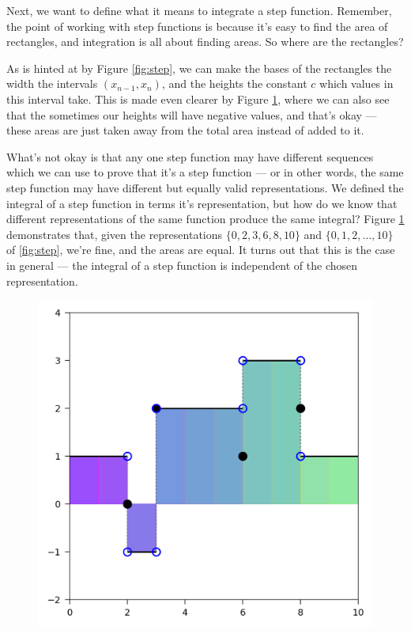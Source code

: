 \medskip
Next, we want to define what it means to integrate a step function. Remember, the point of working with step functions is because it's easy to find the area of rectangles, and integration is all about finding areas. So where are the rectangles? 

\medskip
As is hinted at by Figure \ref{fig:step}, we can make the bases of the rectangles the width the intervals $(x_{n-1}, x_n)$, and the heights the constant $c$ which values in this interval take. This is made even clearer by Figure \ref{fig:stepfilled}, where we can also see that the sometimes our heights will have negative values, and that's okay --- these areas are just taken away from the total area instead of added to it.
 
What's not okay is that any one step function may have different sequences which we can use to prove that it's a step function --- or in other words, the same step function may have different but equally valid representations. We defined the integral of a step function in terms it's representation, but how do we know that different representations of the same function produce the same integral? Figure \ref{fig:stepfilled} demonstrates that, given the representations $\{0, 2, 3, 6, 8, 10\}$ and $\{0, 1, 2, \ldots, 10\}$ of \ref{fig:step}, we're fine, and the areas are equal. It turns out that this is the case in general --- the integral of a step function is independent of the chosen representation.

\begin{figure}[h]
  \centering
  \includegraphics{Code/StepFilled2.png}
  \label{fig:stepfilled}
\end{figure}

